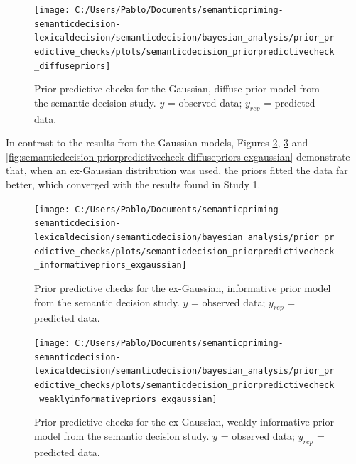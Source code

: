 \documentclass[
  12pt,
  man,floatsintext]{apa7}
\begin{document}
\begin{figure}

{\centering \texttt{[image: C:/Users/Pablo/Documents/semanticpriming-semanticdecision-lexicaldecision/semanticdecision/bayesian\_analysis/prior\_predictive\_checks/plots/semanticdecision\_priorpredictivecheck\_diffusepriors]} 

}

\caption{Prior predictive checks for the Gaussian, diffuse prior model from the semantic decision study. \(y\) = observed data; \(y_{rep}\) = predicted data.}\label{fig:semanticdecision-priorpredictivecheck-diffusepriors}
\end{figure}

In contrast to the results from the Gaussian models, Figures \ref{fig:semanticdecision-priorpredictivecheck-informativepriors-exgaussian}, \ref{fig:semanticdecision-priorpredictivecheck-weaklyinformativepriors-exgaussian} and \ref{fig:semanticdecision-priorpredictivecheck-diffusepriors-exgaussian} demonstrate that, when an ex-Gaussian distribution was used, the priors fitted the data far better, which converged with the results found in Study 1.



\begin{figure}

{\centering \texttt{[image: C:/Users/Pablo/Documents/semanticpriming-semanticdecision-lexicaldecision/semanticdecision/bayesian\_analysis/prior\_predictive\_checks/plots/semanticdecision\_priorpredictivecheck\_informativepriors\_exgaussian]} 

}

\caption{Prior predictive checks for the ex-Gaussian, informative prior model from the semantic decision study. \(y\) = observed data; \(y_{rep}\) = predicted data.}\label{fig:semanticdecision-priorpredictivecheck-informativepriors-exgaussian}
\end{figure}



\begin{figure}

{\centering \texttt{[image: C:/Users/Pablo/Documents/semanticpriming-semanticdecision-lexicaldecision/semanticdecision/bayesian\_analysis/prior\_predictive\_checks/plots/semanticdecision\_priorpredictivecheck\_weaklyinformativepriors\_exgaussian]} 

}

\caption{Prior predictive checks for the ex-Gaussian, weakly-informative prior model from the semantic decision study. \(y\) = observed data; \(y_{rep}\) = predicted data.}\label{fig:semanticdecision-priorpredictivecheck-weaklyinformativepriors-exgaussian}
\end{figure}
\end{document}
